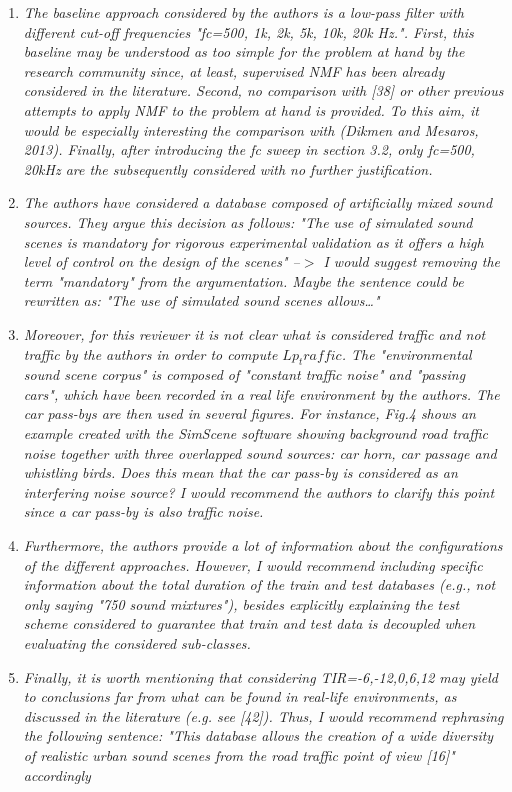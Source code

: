 \documentclass[10pt]{article}
\begin{document}
\begin{enumerate}
\item \emph{The baseline approach considered by the authors is a low-pass filter with different cut-off frequencies "fc={500, 1k, 2k, 5k, 10k, 20k} Hz.". First, this baseline may be understood as too simple for the problem at hand by the research community since, at least, supervised NMF has been already considered in the literature. Second, no comparison with [38] or other previous attempts to apply NMF to the problem at hand is provided. To this aim, it would be especially interesting the comparison with (Dikmen and Mesaros, 2013). Finally, after introducing the fc sweep in section 3.2, only fc={500, 20k}Hz are the subsequently considered with no further justification.}

\item \emph{The authors have considered a database composed of artificially mixed sound sources. They argue this decision as follows: "The use of simulated sound scenes is mandatory for rigorous experimental validation as it offers a high level of control on the design of the scenes" --$>$ I would suggest removing the term "mandatory" from the argumentation. Maybe the sentence could be rewritten as: "The use of simulated sound scenes allows…" }

\item \emph{Moreover, for this reviewer it is not clear what is considered traffic and not traffic by the authors in order to compute $Lp_traffic$. The "environmental sound scene corpus" is composed of "constant traffic noise" and "passing cars", which have been recorded in a real life environment by the authors. The car pass-bys are then used in several figures. For instance, Fig.4 shows an example created with the SimScene software showing background road traffic noise together with three overlapped sound sources: car horn, car passage and whistling birds. Does this mean that the car pass-by is considered as an interfering noise source? I would recommend the authors to clarify this point since a car pass-by is also traffic noise.}

\item \emph{Furthermore, the authors provide a lot of information about the configurations of the different approaches. However, I would recommend including specific information about the total duration of the train and test databases (e.g., not only saying "750 sound mixtures"), besides explicitly explaining the test scheme considered to guarantee that train and test data is decoupled when evaluating the considered sub-classes.}

\item \emph{Finally, it is worth mentioning that considering TIR={-6,-12,0,6,12} may yield to conclusions far from what can be found in real-life environments, as discussed in the literature (e.g. see [42]). Thus, I would recommend rephrasing the following sentence: "This database allows the creation of a wide diversity of realistic urban sound scenes from the road traffic point of view [16]" accordingly}

\end{enumerate}
\end{document}
